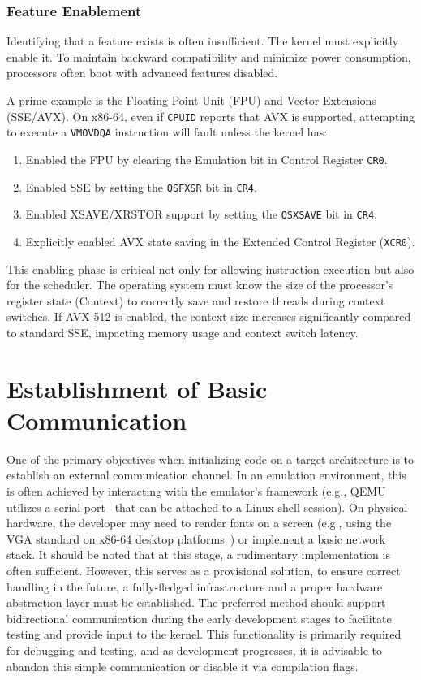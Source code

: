 \documentclass[a4paper,10pt,twoside]{report}
\theoremstyle{definition}
\begin{document}
\subsubsection{Feature Enablement}
Identifying that a feature exists is often insufficient. The kernel must explicitly enable it. To maintain backward compatibility and minimize power consumption, processors often boot with advanced features disabled.

A prime example is the Floating Point Unit (FPU) and Vector Extensions (SSE/AVX). On x86-64, even if \texttt{CPUID} reports that AVX is supported, attempting to execute a \texttt{VMOVDQA} instruction will fault unless the kernel has:
\begin{enumerate}
    \item Enabled the FPU by clearing the Emulation bit in Control Register \texttt{CR0}.
    \item Enabled SSE by setting the \texttt{OSFXSR} bit in \texttt{CR4}.
    \item Enabled XSAVE/XRSTOR support by setting the \texttt{OSXSAVE} bit in \texttt{CR4}.
    \item Explicitly enabled AVX state saving in the Extended Control Register (\texttt{XCR0}).
\end{enumerate}
\cite{Intel-ControlRegisters, Intel-XSAVE}

This enabling phase is critical not only for allowing instruction execution but also for the scheduler. The operating system must know the size of the processor's register state (Context) to correctly save and restore threads during context switches. If AVX-512 is enabled, the context size increases significantly compared to standard SSE, impacting memory usage and context switch latency.

\section{Establishment of Basic Communication}
\label{sec:comms}

One of the primary objectives when initializing code on a target architecture is to establish an external communication channel. In an emulation environment, this is often achieved by interacting with the emulator's framework (e.g., QEMU utilizes a serial port~\cite{wikibooks-serial} that can be attached to a Linux shell session). On physical hardware, the developer may need to render fonts on a screen (e.g., using the VGA standard on x86-64 desktop platforms~\cite{osdev-barebones, osdev-vga}) or implement a basic network stack. It should be noted that at this stage, a rudimentary implementation is often sufficient. However, this serves as a provisional solution, to ensure correct handling in the future, a fully-fledged infrastructure and a proper hardware abstraction layer must be established. The preferred method should support bidirectional communication during the early development stages to facilitate testing and provide input to the kernel. This functionality is primarily required for debugging and testing, and as development progresses, it is advisable to abandon this simple communication or disable it via compilation flags.
\end{document}
